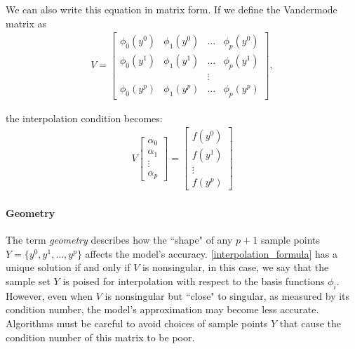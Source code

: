 We can also write this equation in matrix form.
If we define the Vandermode matrix as
\begin{align}
\label{vandermonde}
V=
\begin{bmatrix}
    \phi_0(y^0)      & \phi_1(y^0)       & \ldots & \phi_{p}(y^0)      \\
    \phi_0(y^1)      & \phi_1(y^1)       & \dots  & \phi_{p}(y^1)      \\
                     &                   & \vdots &                    \\
    \phi_0(y^{p})    & \phi_1(y^{p})     & \ldots & \phi_{p}(y^{p})
\end{bmatrix},
\end{align}

the interpolation condition becomes:
\begin{align}
V
\begin{bmatrix}
    \alpha_0     \\
    \alpha_1     \\
    \vdots       \\
    \alpha_p
\end{bmatrix}
=
\begin{bmatrix}
    f(y^0)     \\
    f(y^1)     \\
    \vdots     \\
    f(y^p)
\end{bmatrix}
\end{align}

\paragraph{Geometry}
\label{geometry}
The term \emph{geometry} describes how the ``shape" of any $p+1$ sample points $Y = \{y^0, y^1, \ldots, y^p\}$ affects the model's accuracy.
\cref{interpolation_formula} has a unique solution if and only if $V$ is nonsingular, in this case, we say that the sample set $Y$ is poised for interpolation with respect to the basis functions $\phi_i$.
However, even when $V$ is nonsingular but ``close" to singular, as measured by its condition number, the model's approximation may become less accurate.
Algorithms must be careful to avoid choices of sample points $Y$ that cause the condition number of this matrix to be poor.

